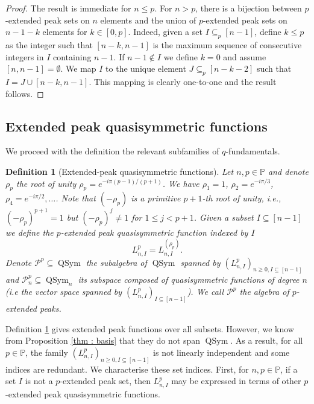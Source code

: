 \documentclass[submission]{FPSAC2023}
\newtheorem{defn}{Definition}
\newcommand{\PP}{\mathbb{P}} %
\newcommand{\QSym}{\operatorname{QSym}}
\begin{document}
%
%
\begin{proof}
The result is immediate for $n \leq p$. For $n>p$, there is a  bijection between $p$-extended peak sets on $n$ elements and the union of $p$-extended peak sets on $n-1-k$ elements for $k \in [0,p]$. Indeed, given a set $I \subseteq_p [n-1]$, define $k \leq p$ as the integer such that $[n-k, n-1]$ is the maximum sequence of consecutive integers in $I$ containing $n-1$. If $n-1 \notin I$ we define $k=0$ and assume $[n, n-1] = \emptyset$. We map $I$ to the unique element $J \subseteq_p [n-k-2]$ such that $I = J \cup [n-k, n-1]$. This mapping is clearly one-to-one and the result follows. 
\end{proof}
\subsection{Extended peak quasisymmetric functions}
\noindent We proceed with the definition the relevant subfamilies of $q$-fundamentals.
%
\begin{defn}[Extended-peak quasisymmetric functions]
\label{def.extended_peak_qsym}
Let $n, p \in \PP$ and denote $\rho_p$ the root of unity $\rho_p = e^{-i\pi (p-1)/(p+1)}$. We have $\rho_1 = 1$, $\rho_2 = e^{-i\pi/3}$, $\rho_4 = e^{-i\pi/2},\dots$. Note that $(-\rho_p)$ is a primitive $p+1$-th root of unity, i.e., $(-\rho_p)^{p+1}=1$ but $(-\rho_p)^j \neq 1$ for $1\leq j < p+1$. Given a subset $I\subseteq [n-1]$ we define the $p$-extended peak quasisymmetric function indexed by $I$
\begin{equation}
L^p_{n, I} = L^{(\rho_p)}_{n, I}. 
\end{equation}
Denote $\mathcal{P}^p \subseteq \QSym$ the subalgebra of $\QSym$ spanned by $(L^p_{n, I})_{n\geq0, I\subseteq[n-1]}$ and $\mathcal{P}^p_n \subseteq \QSym_n$ its subspace composed of quasisymmetric functions of degree $n$ (i.e the vector space spanned by $(L^p_{n, I})_{I\subseteq[n-1]}$). We call $\mathcal{P}^p$ the \emph{algebra of $p$-extended peaks}. 
\end{defn}
%
Definition \ref{def.extended_peak_qsym} gives extended peak functions over all subsets. However, we know from Proposition \ref{thm : basis} that they do not span $\QSym$. As a result, for all $p \in \PP$, the family $(L^p_{n, I})_{n\geq0, I\subseteq[n-1]}$ is not linearly independent  and some indices are redundant. We characterise these set indices. First, for $n, p \in \PP$, if a set $I$ is not a $p$-extended peak set, then $L^p_{n, I}$ may be expressed in terms of other $p$-extended peak quasisymmetric functions.
\end{document}

